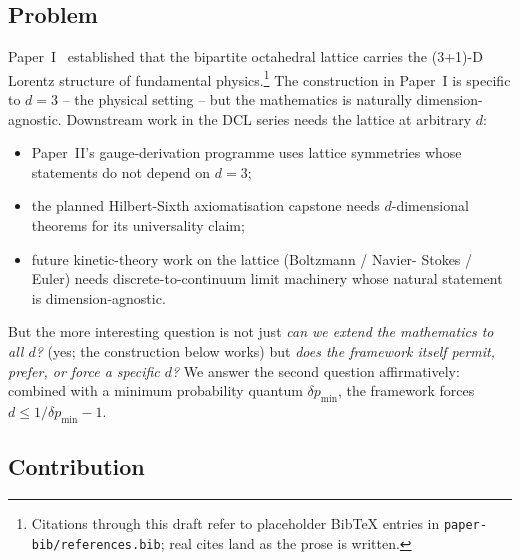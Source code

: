 
\label{sec:introduction}


\subsection{Problem}
\label{subsec:problem}

Paper~I~\cite{example2024} established that the bipartite octahedral
lattice carries the (3+1)-D Lorentz structure of fundamental
physics.\footnote{Citations through this draft refer to placeholder
BibTeX entries in \texttt{paper-bib/references.bib}; real cites land
as the prose is written.}  The construction in Paper~I is specific
to $d = 3$ -- the physical setting -- but the mathematics is
naturally dimension-agnostic.  Downstream work in the DCL series
needs the lattice at arbitrary $d$:

\begin{itemize}
\item Paper~II's gauge-derivation programme uses lattice symmetries
      whose statements do not depend on $d = 3$;
\item the planned Hilbert-Sixth axiomatisation capstone needs
      $d$-dimensional theorems for its universality claim;
\item future kinetic-theory work on the lattice (Boltzmann / Navier-
      Stokes / Euler) needs discrete-to-continuum limit machinery
      whose natural statement is dimension-agnostic.
\end{itemize}

But the more interesting question is not just \emph{can we extend the
mathematics to all $d$?} (yes; the construction below works) but
\emph{does the framework itself permit, prefer, or force a specific
$d$?}  We answer the second question affirmatively: combined with a
minimum probability quantum $\delta p_\min$, the framework forces
$d \leq 1/\delta p_\min - 1$.

\subsection{Contribution}
\label{subsec:contribution}

